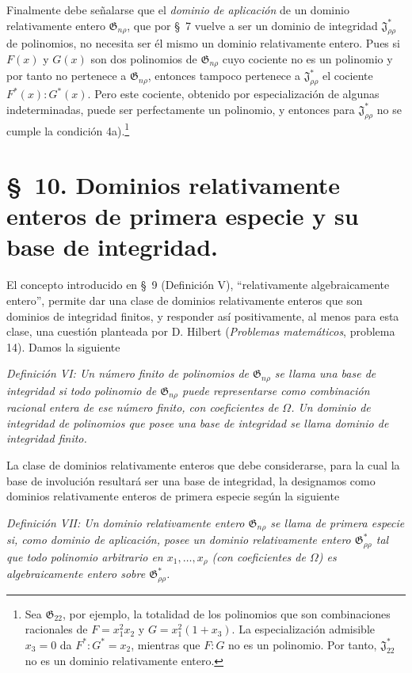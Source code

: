 \documentclass[11pt]{article}
\providecommand{\Jdom}{\mathfrak{J}}
\providecommand{\Gdom}{\mathfrak{G}}
\begin{document}
Finalmente debe señalarse que el \emph{dominio de aplicación} de un dominio relativamente entero $\Gdom_{n\rho}$, que por \S\ 7 vuelve a ser un dominio de integridad $\Jdom^*_{\rho\rho}$ de polinomios, no necesita ser él mismo un dominio relativamente entero. Pues si $F(x)$ y $G(x)$ son dos polinomios de $\Gdom_{n\rho}$ cuyo cociente no es un polinomio y por tanto no pertenece a $\Gdom_{n\rho}$, entonces tampoco pertenece a $\Jdom^*_{\rho\rho}$ el cociente $F^*(x):G^*(x)$. Pero este cociente, obtenido por especialización de algunas indeterminadas, puede ser perfectamente un polinomio, y entonces para $\Jdom^*_{\rho\rho}$ no se cumple la condición 4a).\footnote{Sea $\Gdom_{22}$, por ejemplo, la totalidad de los polinomios que son combinaciones racionales de $F=x_1^2x_2$ y $G=x_1^2(1+x_3)$. La especialización admisible $x_3=0$ da $F^*:G^*=x_2$, mientras que $F:G$ no es un polinomio. Por tanto, $\Jdom^*_{22}$ no es un dominio relativamente entero.}

\section*{\S\ 10. Dominios relativamente enteros de primera especie y su base de integridad.}

El concepto introducido en \S\ 9 (Definición V), ``relativamente algebraicamente entero'', permite dar una clase de dominios relativamente enteros que son dominios de integridad finitos, y responder así positivamente, al menos para esta clase, una cuestión planteada por D. Hilbert (\emph{Problemas matemáticos}, problema 14). Damos la siguiente

\emph{Definición VI: Un número finito de polinomios de $\Gdom_{n\rho}$ se llama una base de integridad si todo polinomio de $\Gdom_{n\rho}$ puede representarse como combinación racional entera de ese número finito, con coeficientes de $\Omega$. Un dominio de integridad de polinomios que posee una base de integridad se llama dominio de integridad finito.}

La clase de dominios relativamente enteros que debe considerarse, para la cual la base de involución resultará ser una base de integridad, la designamos como dominios relativamente enteros de primera especie según la siguiente

\emph{Definición VII: Un dominio relativamente entero $\Gdom_{n\rho}$ se llama de primera especie si, como dominio de aplicación, posee un dominio relativamente entero $\Gdom^*_{\rho\rho}$ tal que todo polinomio arbitrario en $x_1,\ldots,x_\rho$ (con coeficientes de $\Omega$) es algebraicamente entero sobre $\Gdom^*_{\rho\rho}$.}
\end{document}
